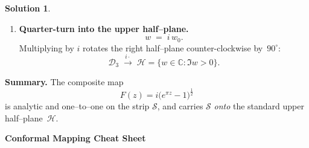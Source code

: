 \documentclass[12pt]{article}
\theoremstyle{definition} %
\newtheorem{solution}{Solution}
\theoremstyle{plain} %
\begin{document}
\begin{solution}
\begin{enumerate}[label=\textbf{Step \arabic*:}, itemsep=1.4ex]
      \item \textbf{Quarter-turn into the upper half–plane.}  
      \[
      w \;=\; i\,w_0.
      \]
      Multiplying by $i$ rotates the right half–plane
      counter-clockwise by~$90^{\circ}$:
      \[
      \mathcal D_3
      \;\xrightarrow{\,i\cdot\,}\;
      \boxed{
         \mathcal H
         = \{w\in\mathbb{C} : \Im w>0\}
       }.
      \]
      
      \end{enumerate}
      
      \medskip
      \textbf{Summary.}  
      The composite map
      \[
      \boxed{\;
         F(z)=i\bigl(e^{\pi z}-1\bigr)^{\tfrac12}
       \;}
      \]
      is analytic and one–to–one on the strip
      $\mathcal S$, and carries $\mathcal S$ \emph{onto} the standard
      upper half–plane~$\mathcal H$.
      \end{solution} 
%

\begin{center}
   \Large\bfseries Conformal Mapping Cheat Sheet
 \end{center}
 \medskip
 
\end{document}

